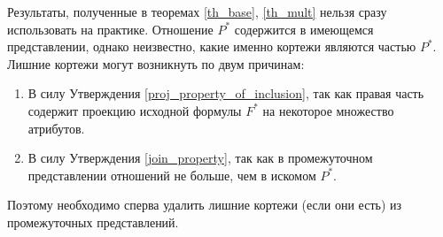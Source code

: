 \documentclass[10pt,a4paper]{article}
\begin{document}
Результаты, полученные в теоремах \ref{th_base}, \ref{th_mult} нельзя сразу
использовать на практике. Отношение $P^{\ast}$ содержится в имеющемся
представлении, однако неизвестно, какие именно кортежи являются частью
$P^{\ast}$. Лишние кортежи могут возникнуть по двум причинам:
\begin{enumerate}
  \item В силу Утверждения \ref{proj_property_of_inclusion}, так как правая
  часть содержит проекцию исходной формулы $F^{\ast}$ на некоторое множество
  атрибутов.
  \item В силу Утверждения \ref{join_property}, так как в промежуточном
  представлении отношений не больше, чем в искомом $P^{\ast}$.
\end{enumerate}
Поэтому необходимо сперва удалить лишние кортежи (если они есть) из
промежуточных представлений.


\end{document}
